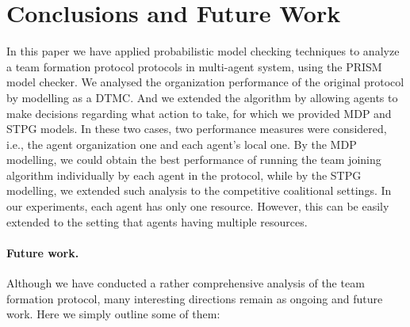 \documentclass{llncs}
\begin{document}

\section{Conclusions and Future Work}

In this paper we have applied probabilistic model checking techniques to analyze a team formation protocol protocols in multi-agent system, using the PRISM model checker. We analysed the organization performance of the original protocol by modelling as a DTMC. And we extended the algorithm by allowing agents to make decisions regarding what action to take, for which we provided MDP and STPG models. In these two cases, two performance measures were considered, i.e., the agent organization one and each agent's local one. By the MDP modelling, we could obtain the best performance
of running the team joining algorithm individually by each agent in the protocol, while by the STPG modelling, we extended such analysis to the competitive coalitional settings. In our experiments, each agent has only one resource. However, this can be easily extended to the setting that agents having multiple resources.

\paragraph{Future work.} Although we have conducted a rather comprehensive analysis of the team formation protocol, many interesting directions remain as ongoing and future work. Here we simply outline some of them:
\end{document}
